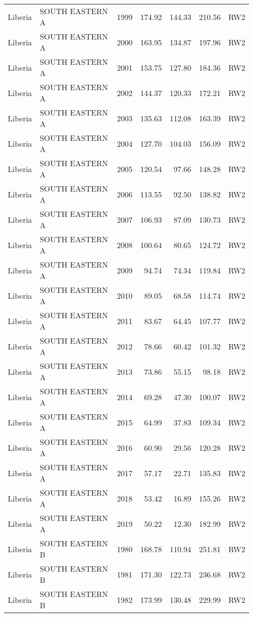 \begin{longtable}{lllrrrl}
  Liberia & SOUTH EASTERN A & 1999 & 174.92 & 144.33 & 210.56 & RW2 \\ 
  Liberia & SOUTH EASTERN A & 2000 & 163.95 & 134.87 & 197.96 & RW2 \\ 
  Liberia & SOUTH EASTERN A & 2001 & 153.75 & 127.80 & 184.36 & RW2 \\ 
  Liberia & SOUTH EASTERN A & 2002 & 144.37 & 120.33 & 172.21 & RW2 \\ 
  Liberia & SOUTH EASTERN A & 2003 & 135.63 & 112.08 & 163.39 & RW2 \\ 
  Liberia & SOUTH EASTERN A & 2004 & 127.70 & 104.03 & 156.09 & RW2 \\ 
  Liberia & SOUTH EASTERN A & 2005 & 120.54 & 97.66 & 148.28 & RW2 \\ 
  Liberia & SOUTH EASTERN A & 2006 & 113.55 & 92.50 & 138.82 & RW2 \\ 
  Liberia & SOUTH EASTERN A & 2007 & 106.93 & 87.09 & 130.73 & RW2 \\ 
  Liberia & SOUTH EASTERN A & 2008 & 100.64 & 80.65 & 124.72 & RW2 \\ 
  Liberia & SOUTH EASTERN A & 2009 & 94.74 & 74.34 & 119.84 & RW2 \\ 
  Liberia & SOUTH EASTERN A & 2010 & 89.05 & 68.58 & 114.74 & RW2 \\ 
  Liberia & SOUTH EASTERN A & 2011 & 83.67 & 64.45 & 107.77 & RW2 \\ 
  Liberia & SOUTH EASTERN A & 2012 & 78.66 & 60.42 & 101.32 & RW2 \\ 
  Liberia & SOUTH EASTERN A & 2013 & 73.86 & 55.15 & 98.18 & RW2 \\ 
  Liberia & SOUTH EASTERN A & 2014 & 69.28 & 47.30 & 100.07 & RW2 \\ 
  Liberia & SOUTH EASTERN A & 2015 & 64.99 & 37.83 & 109.34 & RW2 \\ 
  Liberia & SOUTH EASTERN A & 2016 & 60.90 & 29.56 & 120.28 & RW2 \\ 
  Liberia & SOUTH EASTERN A & 2017 & 57.17 & 22.71 & 135.83 & RW2 \\ 
  Liberia & SOUTH EASTERN A & 2018 & 53.42 & 16.89 & 155.26 & RW2 \\ 
  Liberia & SOUTH EASTERN A & 2019 & 50.22 & 12.30 & 182.99 & RW2 \\ 
  Liberia & SOUTH EASTERN B & 1980 & 168.78 & 110.94 & 251.81 & RW2 \\ 
  Liberia & SOUTH EASTERN B & 1981 & 171.30 & 122.73 & 236.68 & RW2 \\ 
  Liberia & SOUTH EASTERN B & 1982 & 173.99 & 130.48 & 229.99 & RW2 \\ 

\end{longtable}
